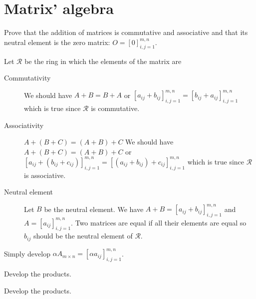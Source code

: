 \section{Matrix' algebra}
Prove that the addition of matrices is commutative and associative and that its neutral element is the zero matrix: $O = [0]_{i,j=1}^{m,n}$.
\begin{solution}
  Let $\mathcal{R}$ be the ring in which the elements of the matrix are
  \begin{description}
    \item[Commutativity]
      We should have $A+B=B+A$ or
      $[a_{ij} + b_{ij}]_{i,j=1}^{m,n} = [b_{ij} + a_{ij}]_{i,j=1}^{m,n}$
      which is true since $\mathcal{R}$ is commutative.
    \item[Associativity] $A+(B+C)=(A+B)+C$
      We should have $A+(B+C)=(A+B)+C$ or
      $[a_{ij} + (b_{ij} + c_{ij})]_{i,j=1}^{m,n} 
      = [(a_{ij} + b_{ij}) + c_{ij}]_{i,j=1}^{m,n}$
      which is true since $\mathcal{R}$ is associative.
    \item[Neutral element] Let $B$ be the neutral element.
      We have
      $A + B = [a_{ij} + b_{ij}]_{i,j=1}^{m,n}$
      and $A = [a_{ij}]_{i,j=1}^{m,n}$.
      Two matrices are equal if all their elements are equal so $b_{ij}$
      should be the neutral element of $\mathcal{R}$.
  \end{description}
\end{solution}

\begin{solution}
  Simply develop $\alpha A_{m \times n}=[\alpha a_{ij}]_{i,j=1}^{m,n}$.
\end{solution}

\begin{solution}
  Develop the products.
\end{solution}

\begin{solution}
  Develop the products.
\end{solution}


